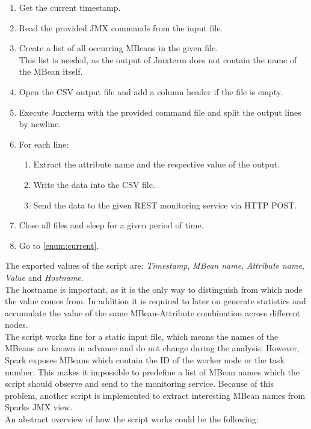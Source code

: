 \begin{enumerate}
    \item Get the current timestamp.
    \label{enum:current}
    \item Read the provided JMX commands from the input file.
    \item Create a list of all occurring MBeans in the given file.\\
        This list is needed, as the output of Jmxterm does not contain the name of the MBean itself.
    \item Open the CSV output file and add a column header if the file is empty.
    \item Execute Jmxterm with the provided command file and split the output lines by newline.
    \item For each line:
        \begin{enumerate}
            \item Extract the attribute name and the respective value of the output.
            \item Write the data into the CSV file.
            \item Send the data to the given REST monitoring service via HTTP POST.
        \end{enumerate}
    \item Close all files and sleep for a given period of time.
    \item Go to \ref{enum:current}.
\end{enumerate}

The exported values of the script are: \textit{Timestamp}, \textit{MBean name}, \textit{Attribute name}, \textit{Value} and \textit{Hostname}.\\
The hostname is important, as it is the only way to distinguish from which node the value comes from.
In addition it is required to later on generate statistics and accumulate the value of the same MBean-Attribute combination across different nodes.\\
The script works fine for a static input file, which means the names of the MBeans are known in advance and do not change during the analysis.
However, Spark exposes MBeans which contain the ID of the worker node or the task number.
This makes it impossible to predefine a list of MBean names which the script should observe and send to the monitoring service.
Because of this problem, another script is implemented to extract interesting MBean names from Sparks JMX view.\\
An abstract overview of how the script works could be the following:

